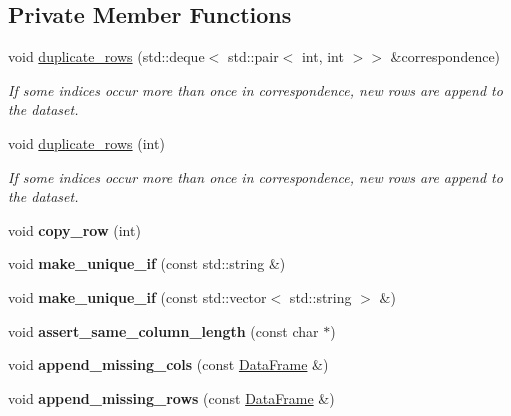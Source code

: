 \subsection*{Private Member Functions}
\begin{DoxyCompactItemize}
\item 
void \hyperlink{classDataFrame_a6c62eeccda5f10832a286906482263f7}{duplicate\+\_\+rows} (std\+::deque$<$ std\+::pair$<$ int, int $>$$>$ \&correspondence)
\begin{DoxyCompactList}\small\item\em If some indices occur more than once in correspondence, new rows are append to the dataset. \end{DoxyCompactList}\item 
void \hyperlink{classDataFrame_ae4b43ae157eb9bba9c85bfc86f4679f7}{duplicate\+\_\+rows} (int)
\begin{DoxyCompactList}\small\item\em If some indices occur more than once in correspondence, new rows are append to the dataset. \end{DoxyCompactList}\item 
\mbox{\label{classDataFrame_ad44e1c50bc67dc453a02bbcdf7b13a98}} 
void {\bfseries copy\+\_\+row} (int)
\item 
\mbox{\label{classDataFrame_a8454f81fa6854f280c48672214224160}} 
void {\bfseries make\+\_\+unique\+\_\+if} (const std\+::string \&)
\item 
\mbox{\label{classDataFrame_a2bb66e58b8b8153d4ae7c5e640f0fab4}} 
void {\bfseries make\+\_\+unique\+\_\+if} (const std\+::vector$<$ std\+::string $>$ \&)
\item 
\mbox{\label{classDataFrame_ae996ebef2abb39f125adc2cdff8846aa}} 
void {\bfseries assert\+\_\+same\+\_\+column\+\_\+length} (const char $\ast$)
\item 
\mbox{\label{classDataFrame_a56acb2da2d421ca0d28324a069593e23}} 
void {\bfseries append\+\_\+missing\+\_\+cols} (const \hyperlink{classDataFrame}{Data\+Frame} \&)
\item 
\mbox{\label{classDataFrame_a5e5818b6152d279647995f528fbb5ca0}} 
void {\bfseries append\+\_\+missing\+\_\+rows} (const \hyperlink{classDataFrame}{Data\+Frame} \&)
$$
\end{DoxyCompactItemize}
